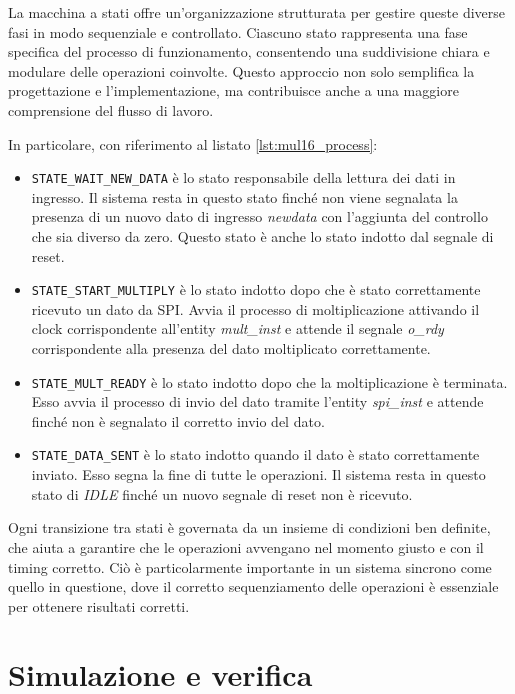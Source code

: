 \documentclass[titlepage]{report}
\begin{document}
			La macchina a stati offre un'organizzazione strutturata per gestire queste diverse fasi in modo sequenziale e controllato. Ciascuno stato rappresenta una fase specifica del processo di funzionamento, consentendo una suddivisione chiara e modulare delle operazioni coinvolte. Questo approccio non solo semplifica la progettazione e l'implementazione, ma contribuisce anche a una maggiore comprensione del flusso di lavoro.

			In particolare, con riferimento al listato \ref*{lst:mul16_process}:
			
			\begin{itemize}
				\item \texttt{STATE\_WAIT\_NEW\_DATA} è lo stato responsabile della lettura dei dati in ingresso. Il sistema resta in questo stato finché non viene segnalata la presenza di un nuovo dato di ingresso \emph{newdata} con l'aggiunta del controllo che sia diverso da zero. Questo stato è anche lo stato indotto dal segnale di reset.
				\item \texttt{STATE\_START\_MULTIPLY} è lo stato indotto dopo che è stato correttamente ricevuto un dato da SPI. Avvia il processo di moltiplicazione attivando il clock corrispondente all'entity \emph{mult\_inst} e attende il segnale \emph{o\_rdy} corrispondente alla presenza del dato moltiplicato correttamente.
				\item \texttt{STATE\_MULT\_READY} è lo stato indotto dopo che la moltiplicazione è terminata. Esso avvia il processo di invio del dato tramite l'entity \textit{spi\_inst} e attende finché non è segnalato il corretto invio del dato.
				\item \texttt{STATE\_DATA\_SENT} è lo stato indotto quando il dato è stato correttamente inviato. Esso segna la fine di tutte le operazioni. Il sistema resta in questo stato di \textit{IDLE} finché un nuovo segnale di reset non è ricevuto.
			\end{itemize} 

			Ogni transizione tra stati è governata da un insieme di condizioni ben definite, che aiuta a garantire che le operazioni avvengano nel momento giusto e con il timing corretto. Ciò è particolarmente importante in un sistema sincrono come quello in questione, dove il corretto sequenziamento delle operazioni è essenziale per ottenere risultati corretti.

\chapter*{Simulazione e verifica}
\label{ch:simulazione_verifica}
\end{document}
